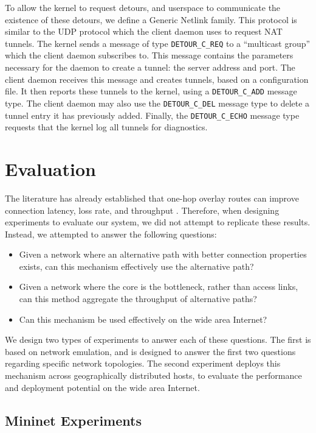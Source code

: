 \documentclass{cwru}
\begin{document}
To allow the kernel to request detours, and userspace to communicate the
existence of these detours, we define a Generic Netlink family. This protocol is
similar to the UDP protocol which the client daemon uses to request NAT tunnels.
The kernel sends a message of type \texttt{DETOUR\_C\_REQ} to a ``multicast
group'' which the client daemon subscribes to. This message contains the
parameters necessary for the daemon to create a tunnel: the server address and
port. The client daemon receives this message and creates tunnels, based on a
configuration file. It then reports these tunnels to the kernel, using a
\texttt{DETOUR\_C\_ADD} message type. The client daemon may also use the
\texttt{DETOUR\_C\_DEL} message type to delete a tunnel entry it has previously
added. Finally, the \texttt{DETOUR\_C\_ECHO} message type requests that the
kernel log all tunnels for diagnostics.

\chapter{Evaluation}
\label{c:eval}

The literature has already established that one-hop overlay routes can improve
connection latency, loss rate, and throughput
\cite{detour,ron,gummadi2004improving}. Therefore, when designing experiments to
evaluate our system, we did not attempt to replicate these results. Instead, we
attempted to answer the following questions:

\begin{itemize}
\item Given a network where an alternative path with better connection
  properties exists, can this mechanism effectively use the alternative path?
\item Given a network where the core is the bottleneck, rather than access
  links, can this method aggregate the throughput of alternative paths?
\item Can this mechanism be used effectively on the wide area Internet?
\end{itemize}

We design two types of experiments to answer each of these questions. The first
is based on network emulation, and is designed to answer the first two questions
regarding specific network topologies. The second experiment deploys this
mechanism across geographically distributed hosts, to evaluate the performance
and deployment potential on the wide area Internet.

\section{Mininet Experiments}
\end{document}

